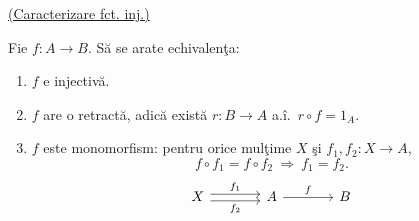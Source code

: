\bigskip
\noindent{}\quad\underline{(Caracterizare fct. inj.)}

\noindent Fie $f:A\longrightarrow B$. Să se arate echivalenţa:
\begin{enumerate}
\item[a)] $f$ e injectivă.
\item[b)] $f$ are o retractă, adică există $r:B\longrightarrow A$
 a.î.\ $r\circ f=1_A$.
\item[c)] $f$ este monomorfism: pentru orice mulţime $X$ şi
 $f_1,f_2:X\longrightarrow A$,
 \[
 f\circ f_1=f\circ f_2\ \Longrightarrow\ f_1=f_2.
 \]
 \[
 \begin{tikzcd}[column sep=large]
 X \arrow[r, shift left=.55ex, "f_1"]
   \arrow[r, shift right=.55ex, "f_2"']
 & A \arrow[r, "f"] & B
 \end{tikzcd}
 \]
\end{enumerate}
